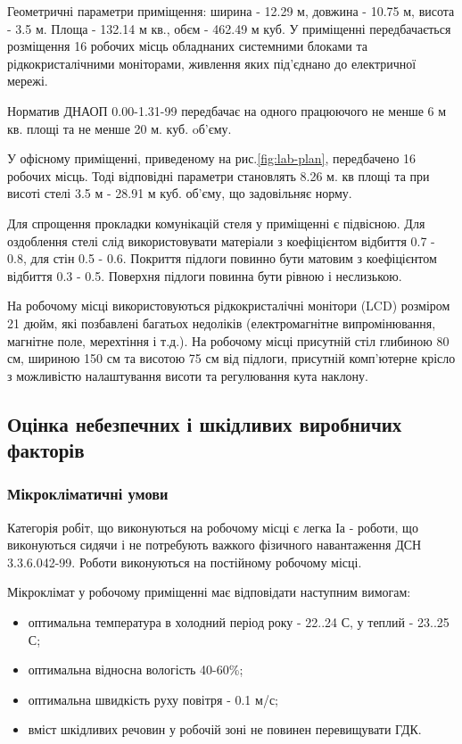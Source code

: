     Геометричні параметри приміщення: ширина - 12.29 м, довжина - 10.75 м, висота - 3.5 м. Площа - 132.14 м кв., обєм - 462.49 м куб.
    У приміщенні передбачається розміщення 16 робочих місць обладнаних системними блоками та рідкокристалічними моніторами, живлення яких під'єднано до електричної мережі.

    Норматив ДНАОП 0.00-1.31-99\cite{lab-dnaop} передбачає на одного працюючого не менше 6 м кв. площі та не менше 20 м. куб. oб'єму.

    У офісному приміщенні, приведеному на рис.\ref{fig:lab-plan}, передбачено 16 робочих місць. Тоді відповідні параметри становлять 8.26 м. кв площі та при висоті стелі 3.5 м -  28.91 м куб. об'єму, що задовільняє норму.

    Для спрощення прокладки комунікацій стеля у приміщенні є підвісною. Для оздоблення стелі слід використовувати матеріали з коефіцієнтом відбиття 0.7 - 0.8, для стін 0.5 - 0.6.
    Покриття підлоги повинно бути матовим з коефіцієнтом відбиття 0.3 - 0.5. Поверхня підлоги повинна бути рівною і неслизькою.

    На робочому місці використовуються рідкокристалічні монітори (LCD) розміром 21 дюйм, які позбавлені багатьох недоліків (електромагнітне випромінювання, магнітне поле, мерехтіння і т.д.). На робочому місці присутній стіл глибиною 80 см, шириною 150 см та висотою 75 см від підлоги, присутній комп'ютерне крісло з можливістю налаштування висоти та регулювання кута наклону.

\subsection{Оцінка небезпечних і шкідливих виробничих факторів}
    \subsubsection{Мікрокліматичні умови}
    Категорія робіт, що виконуються на робочому місці є легка Іа - роботи, що виконуються сидячи і не потребують важкого фізичного навантаження ДСН 3.3.6.042-99\cite{lab-dsn42}. Роботи виконуються на постійному робочому місці.

    Мікроклімат у робочому приміщенні має відповідати наступним вимогам:
    \begin{itemize}
        \item оптимальна температура в холодний період року - 22..24 С, у теплий - 23..25 С;
        \item оптимальна відносна вологість 40-60\%;
        \item оптимальна швидкість руху повітря - 0.1 м/с;
        \item вміст шкідливих речовин у робочій зоні не повинен перевищувати ГДК.
    \end{itemize}

